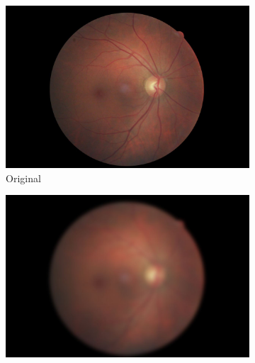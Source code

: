 \begin{figure}[tb]
     \begin{subfigure}[b]{0.24\textwidth}
         \centering
         \includegraphics[width=\textwidth, height=\textwidth]{figures/chapter4/Preprocessing/original.jpg}
         \caption{Original}
    \end{subfigure}
     \hfill
         \begin{subfigure}[b]{0.24\textwidth}
        \centering
        \includegraphics[width=\textwidth, height=\textwidth]{figures/chapter4/Preprocessing/blurred.jpg}

\end{subfigure}
\end{figure}
